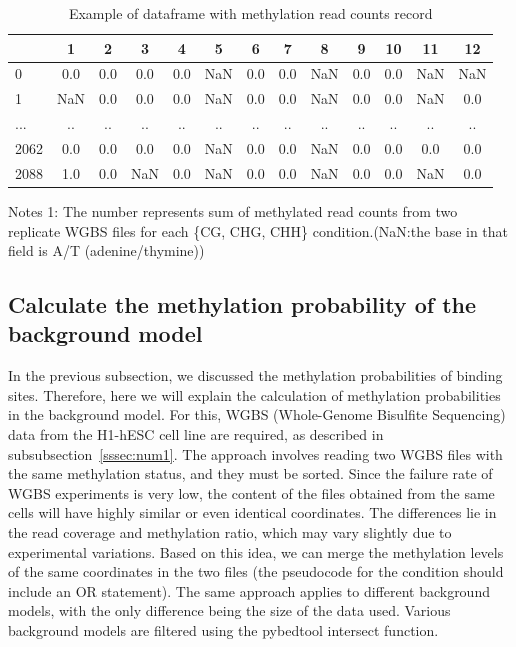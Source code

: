\documentclass{PHlab-thesis}
\begin{document}
\begin{table}[H]
	\centering
	\begin{tabular}{l*{12}{c}}
		\toprule
		         & 1 &  2&  3&4  &5&6&7&8&  9& 10 & 11&12\\
		\midrule
		
		0     &0.0  &0.0  &0.0  &0.0   &NaN  &0.0  &0.0   &NaN &0.0  &0.0   &NaN   &NaN\\
		1     &NaN   &0.0  &0.0  &0.0  &NaN  &0.0  &0.0   &NaN  &0.0 &0.0 &NaN   &0.0\\
		...   &.. &.. &.. &.. &.. &.. &.. &.. &.. &.. &.. &..\\
		
		2062   &0.0  &0.0  &0.0  &0.0  &NaN  &0.0  &0.0   &NaN  &0.0  &0.0   &0.0  &0.0\\
		2088 &1.0  &0.0   &NaN  &0.0   &NaN  &0.0  &0.0  &NaN  &0.0  &0.0   &NaN  &0.0\\
		\bottomrule
	\end{tabular}
	\begin{minipage}{14cm}
		\vspace{0.15cm}
		\footnotesize  Notes 1: The number represents sum of methylated read counts from two replicate WGBS files for each \{CG, CHG, CHH\} condition.(NaN:the base in that field is A/T (adenine/thymine)) 
	\end{minipage}
	\caption{Example of dataframe with methylation read counts record}
	\label{table:methylated}
\end{table}

\subsection{Calculate the methylation probability of the background model}
In the previous subsection, we discussed the methylation probabilities of binding sites. Therefore, here we will explain the calculation of methylation probabilities in the background model. For this, WGBS (Whole-Genome Bisulfite Sequencing) data from the H1-hESC cell line are required, as described in subsubsection~\ref{sssec:num1}. The approach involves reading two WGBS files with the same methylation status, and they must be sorted. Since the failure rate of WGBS experiments is very low, the content of the files obtained from the same cells will have highly similar or even identical coordinates. The differences lie in the read coverage and methylation ratio, which may vary slightly due to experimental variations. Based on this idea, we can merge the methylation levels of the same coordinates in the two files (the pseudocode for the condition should include an OR statement). The same approach applies to different background models, with the only difference being the size of the data used. Various background models are filtered using the pybedtool intersect function.
\end{document}
